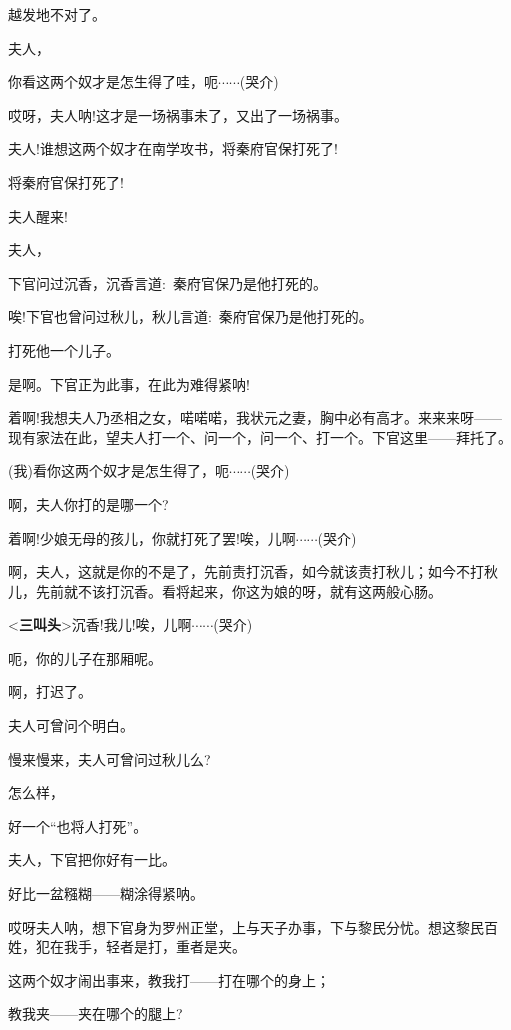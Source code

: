 {越发地不对了。}

{夫人，}

{你看这两个奴才是怎生得了哇，呃$\cdots{}\cdots{}$({\hwfs 哭}{\hwfs 介})}

{哎呀，夫人呐!这才是一场祸事未了，又出了一场祸事。}

{夫人!谁想这两个奴才在南学攻书，将秦府官保打死了!}

{将秦府官保打死了!}

{夫人醒来!}

{夫人，}

{下官问过沉香，沉香言道:~秦府官保乃是他打死的。}

{唉!下官也曾问过秋儿，秋儿言道:~秦府官保乃是他打死的。}

{打死他一个儿子。}

{是啊。下官正为此事，在此为难得紧呐!}

{着啊!我想夫人乃丞相之女，喏喏喏，我状元之妻，胸中必有高才。来来来呀------现有家法在此，望夫人打一个、问一个，问一个、打一个。下官这里------拜托了。}

{(我)看你这两个奴才是怎生得了，呃$\cdots{}\cdots{}$({\hwfs 哭}{\hwfs 介})}

{啊，夫人你打的是哪一个?}

{着啊!少娘无母的孩儿，你就打死了罢!唉，儿啊$\cdots{}\cdots{}$({\hwfs 哭}{\hwfs 介})}

{啊，夫人，这就是你的不是了，先前责打沉香，如今就该责打秋儿；如今不打秋儿，先前就不该打沉香。看将起来，你这为娘的呀，就有这两般心肠。}

{\textless{}{\!\bfseries\akai 三叫头}\!\textgreater{}沉香!我儿!唉，儿啊$\cdots{}\cdots{}$({\hwfs 哭}{\hwfs 介})}

{呃，你的儿子在那厢呢。}

{啊，打迟了。}

{夫人可曾问个明白。}

{慢来慢来，夫人可曾问过秋儿么?}

{怎么样，}\hspace{10pt}~

{好一个``也将人打死''。}

{夫人，下官把你好有一比。}

{好比一盆糨糊------糊涂得紧呐。}

{哎呀夫人呐，想下官身为罗州正堂，上与天子办事，下与黎民分忧。想这黎民百姓，犯在我手，轻者是打，重者是夹。}

{这两个奴才闹出事来，教我打------打在哪个的身上；}

{教我夹------夹在哪个的腿上?}

